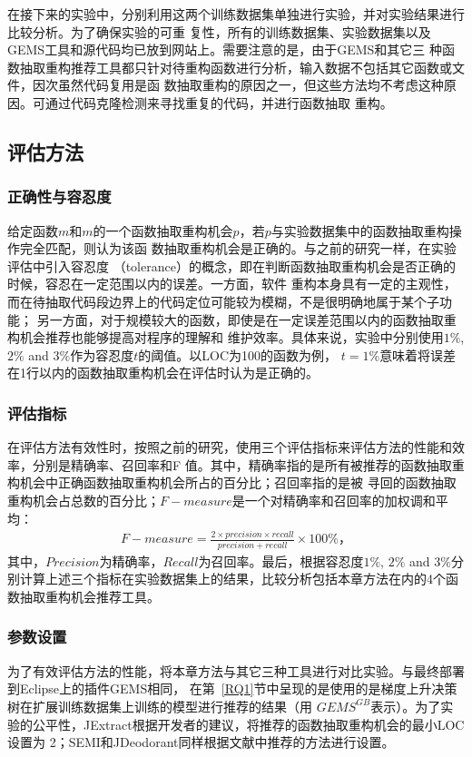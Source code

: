 在接下来的实验中，分别利用这两个训练数据集单独进行实验，并对实验结果进行比较分析。为了确保实验的可重
复性，所有的训练数据集、实验数据集以及GEMS工具和源代码均已放到网站上。需要注意的是，由于GEMS和其它三
种函数抽取重构推荐工具都只针对待重构函数进行分析，输入数据不包括其它函数或文件，因次虽然代码复用是函
数抽取重构的原因之一，但这些方法均不考虑这种原因。可通过代码克隆检测来寻找重复的代码，并进行函数抽取
重构。

\subsection{评估方法}
\subsubsection{正确性与容忍度}\label{tol}
给定函数$m$和$m$的一个函数抽取重构机会$p$，若$p$与实验数据集中的函数抽取重构操作完全匹配，则认为该函
数抽取重构机会是正确的。与之前的研究一样\cite{charalampidou2016identifying}，在实验评估中引入容忍度
（tolerance）的概念，即在判断函数抽取重构机会是否正确的时候，容忍在一定范围以内的误差。一方面，软件
重构本身具有一定的主观性，而在待抽取代码段边界上的代码定位可能较为模糊，不是很明确地属于某个子功能；
另一方面，对于规模较大的函数，即使是在一定误差范围以内的函数抽取重构机会推荐也能够提高对程序的理解和
维护效率。具体来说，实验中分别使用$1\%$, $2\%$ and $3\%$作为容忍度$t$的阈值。以LOC为100的函数为例，
$t=1\%$意味着将误差在1行以内的函数抽取重构机会在评估时认为是正确的。

\subsubsection{评估指标}
在评估方法有效性时，按照之前的研究，使用三个评估指标来评估方法的性能和效率，分别是精确率、召回率和F
值。其中，精确率指的是所有被推荐的函数抽取重构机会中正确函数抽取重构机会所占的百分比；召回率指的是被
寻回的函数抽取重构机会占总数的百分比；$F-measure$是一个对精确率和召回率的加权调和平均：
\begin{eqnarray}
  F-measure = \frac{2 \times precision \times recall}{precision + recall} \times 100\%，
\end{eqnarray}
\label{f1}
其中，$Precision$为精确率，$Recall$为召回率。最后，根据容忍度$1\%$, $2\%$ and $3\%$分别计算上述三个指标在实验数据集上的结果，比较分析包括本章方法在内的4个函数抽取重构机会推荐工具。

\subsubsection{参数设置}\label{canshu}
为了有效评估方法的性能，将本章方法与其它三种工具进行对比实验。与最终部署到Eclipse上的插件GEMS相同，
在第~\ref{RQ1}节中呈现的是使用的是梯度上升决策树在扩展训练数据集上训练的模型进行推荐的结果（用
$GEMS^{GB}$表示）。为了实验的公平性，JExtract根据开发者的建议，将推荐的函数抽取重构机会的最小LOC设置为
2；SEMI和JDeodorant同样根据文献中推荐的方法进行设置。

